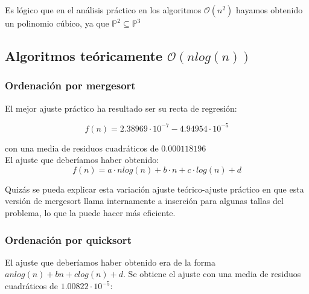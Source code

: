 \documentclass[a4paper, 11pt]{article} %
\begin{document}
Es lógico que en el análisis práctico en los algoritmos $\mathcal{O}(n^2)$
hayamos obtenido un polinomio cúbico, ya que $\mathbb{P}^2 \subseteq \mathbb{P}^3$

\subsection{Algoritmos teóricamente $\mathcal{O}(nlog(n))$}
  \subsubsection{Ordenación por mergesort}
  El mejor ajuste práctico ha resultado ser su recta de regresión: 
  
  $$f(n)=2.38969\cdot 10^{-7} -4.94954\cdot 10 ^{-5}$$
  
  con una media de residuos cuadráticos de $0.000118196$\\
  
  El ajuste que deberíamos haber obtenido: $$f(n)=a \cdot nlog(n) + b\cdot n+c \cdot log(n) + d$$

  Quizás se pueda explicar esta variación ajuste teórico-ajuste práctico en que esta versión de mergesort llama internamente
  a inserción para algunas tallas del problema, lo que la puede hacer más eficiente.\\
  
    
    \noindent{}
    
    
  \subsubsection{Ordenación por quicksort}
  El ajuste que deberíamos haber obtenido era de la forma $anlog(n)+bn+clog(n)+d$.
  Se obtiene el ajuste con una media de residuos cuadráticos de $1.00822\cdot 10^{-5}$:
\end{document}
